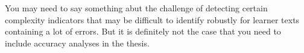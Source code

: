 You may need to say something abut the challenge of detecting certain
complexity indicators that may be difficult to identify robustly for
learner texts containing a lot of errors. But it is definitely not the
case that you need to include accuracy analyses in the thesis.







